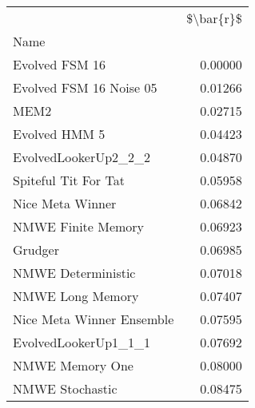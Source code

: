 \begin{tabular}{lr}
\toprule
{} &  \$\textbackslash bar\{r\}\$ \\
Name                      &            \\
\midrule
Evolved FSM 16            &    0.00000 \\
Evolved FSM 16 Noise 05   &    0.01266 \\
MEM2                      &    0.02715 \\
Evolved HMM 5             &    0.04423 \\
EvolvedLookerUp2\_2\_2      &    0.04870 \\
Spiteful Tit For Tat      &    0.05958 \\
Nice Meta Winner          &    0.06842 \\
NMWE Finite Memory        &    0.06923 \\
Grudger                   &    0.06985 \\
NMWE Deterministic        &    0.07018 \\
NMWE Long Memory          &    0.07407 \\
Nice Meta Winner Ensemble &    0.07595 \\
EvolvedLookerUp1\_1\_1      &    0.07692 \\
NMWE Memory One           &    0.08000 \\
NMWE Stochastic           &    0.08475 \\
\bottomrule
\end{tabular}
